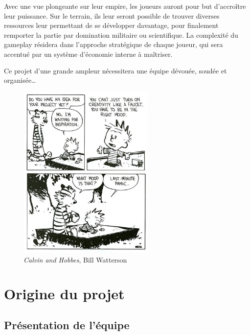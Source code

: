 \documentclass[12pt]{report}
\begin{document}
Avec une vue plongeante sur leur empire, les joueurs auront pour but d’accroître leur puissance. Sur le terrain, ils leur seront possible de trouver diverses ressources leur permettant de se développer davantage, pour finalement remporter la partie par domination militaire ou scientifique. La complexité du gameplay résidera dans l’approche stratégique de chaque joueur, qui sera accentué par un système d’économie interne à maîtriser.

Ce projet d’une grande ampleur nécessitera une équipe dévouée, soudée et organisée\ldots

\begin{figure}
    \centering
    \includegraphics[width=0.6\textwidth]{project_mood}
    \caption*{\textit{Calvin and Hobbes}, Bill Watterson}
\end{figure}

\chapter{Origine du projet}

\section{Présentation de l'équipe}
\end{document}
